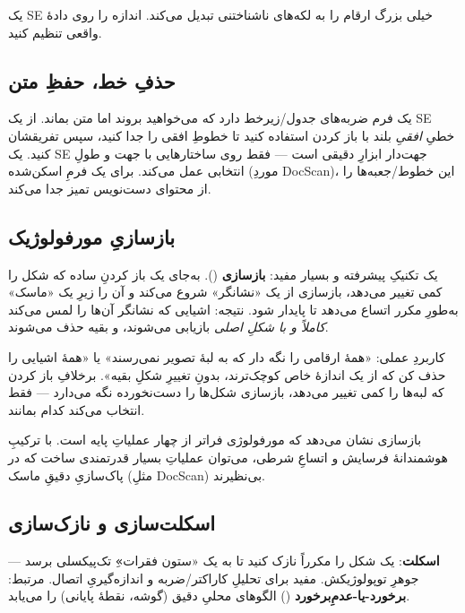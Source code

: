 \documentclass[12pt,a4paper]{article}
\begin{document}
\begin{hoshdar}
یک SEِ خیلی بزرگ ارقام را به لکه‌های ناشناختنی تبدیل می‌کند. اندازه را روی دادهٔ واقعی تنظیم کنید.
\end{hoshdar}

\subsection{حذفِ خط، حفظِ متن}

یک فرم ضربه‌های جدول/زیرخط دارد که می‌خواهید بروند اما متن بماند. از یک SEِ خطیِ \emph{افقیِ} بلند
با باز کردن استفاده کنید تا خطوطِ افقی را جدا کنید، سپس تفریقشان کنید. یک SEِ جهت‌دار ابزارِ دقیقی
است — فقط روی ساختارهایی با جهت و طولِ انتخابی عمل می‌کند. برای یک فرمِ اسکن‌شده (موردِ DocScan)،
این خطوط/جعبه‌ها را از محتوای دست‌نویس تمیز جدا می‌کند.

\subsection{بازسازیِ مورفولوژیک}

یک تکنیکِ پیشرفته و بسیار مفید: \textbf{بازسازی} (). به‌جای یک
باز کردنِ ساده که شکل را کمی تغییر می‌دهد، بازسازی از یک «نشانگر» شروع می‌کند و آن را زیرِ یک
«ماسک» به‌طورِ مکرر اتساع می‌دهد تا پایدار شود. نتیجه: اشیایی که نشانگر آن‌ها را لمس می‌کند
\emph{کاملاً و با شکلِ اصلی} بازیابی می‌شوند، و بقیه حذف می‌شوند.

کاربردِ عملی: «همهٔ ارقامی را نگه دار که به لبهٔ تصویر نمی‌رسند» یا «همهٔ اشیایی را حذف کن که از
یک اندازهٔ خاص کوچک‌ترند، بدونِ تغییرِ شکلِ بقیه». برخلافِ باز کردن که لبه‌ها را کمی تغییر می‌دهد،
بازسازی شکل‌ها را دست‌نخورده نگه می‌دارد — فقط انتخاب می‌کند کدام بمانند.

\begin{yaddasht}
بازسازی نشان می‌دهد که مورفولوژی فراتر از چهار عملیاتِ پایه است. با ترکیبِ هوشمندانهٔ فرسایش و
اتساعِ شرطی، می‌توان عملیاتِ بسیار قدرتمندی ساخت که در پاک‌سازیِ دقیقِ ماسک (مثلِ DocScan) بی‌نظیرند.
\end{yaddasht}

\subsection{اسکلت‌سازی و نازک‌سازی}

\textbf{اسکلت}: یک شکل را مکرراً نازک کنید تا به یک «ستون فقرات»ِ تک‌پیکسلی برسد — جوهرِ توپولوژیکش.
مفید برای تحلیلِ کاراکتر/ضربه و اندازه‌گیریِ اتصال. مرتبط: \textbf{برخورد-یا-عدمِ‌برخورد}
() الگوهای محلیِ دقیق (گوشه، نقطهٔ پایانی) را می‌یابد.
\end{document}
